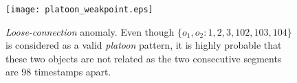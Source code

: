 \begin{figure}[h]
\center
\texttt{[image: platoon\_weakpoint.eps]}
\caption{\emph{Loose-connection} anomaly. Even though $\{o_1, o_2: 1,2,3,102,103,104\}$ is considered as a valid \emph{platoon} pattern, it is highly probable that these two objects are not related as the two consecutive segments  are 98 timestamps apart. 
}
\label{fig:platoon_weakpoint}
\end{figure}

%
%
%
%





